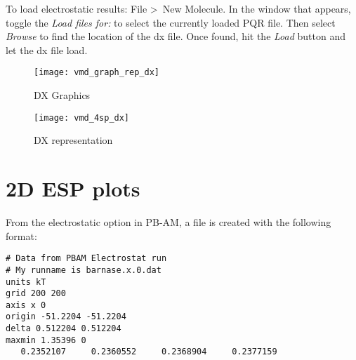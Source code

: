 To load electrostatic results: File \textgreater \, New Molecule. In the window that appears, toggle the \textit{Load files for:} 
to select the currently loaded PQR file. Then select \textit{Browse} to find the location of the dx file. Once found, hit 
the \textit{Load} button and let the dx file load.

\begin{figure}[!htbp]
  \centering
  \begin{minipage}[b]{0.3\textwidth}
    \texttt{[image: vmd\_graph\_rep\_dx]}
    \caption{DX Graphics}
  \end{minipage}
  \hfill
  \begin{minipage}[b]{0.65\textwidth}
    \texttt{[image: vmd\_4sp\_dx]}
    \caption{DX representation}
  \end{minipage}
\end{figure}

 \clearpage

%
%
%


\section{2D ESP plots}
From the electrostatic option in PB-AM, a file is created with the following format: \\

\begin{lstlisting}[style = MyBash]
# Data from PBAM Electrostat run
# My runname is barnase.x.0.dat
units kT
grid 200 200 
axis x 0 
origin -51.2204 -51.2204
delta 0.512204 0.512204
maxmin 1.35396 0
   0.2352107     0.2360552     0.2368904     0.2377159
\end{lstlisting}

